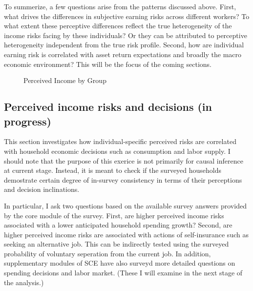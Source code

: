 \documentclass[12pt,notitlepage,onecolumn,aps,pra]{article}
\begin{document}
To summerize, a few questions arise from the patterns discussed above.
First, what drives the differences in subjective earning risks across
different workers? To what extent these perceptive differences reflect
the true heterogeneity of the income risks facing by these individuals?
Or they can be attributed to perceptive heterogeneity independent from
the true risk profile. Second, how are individual earning risk is
correlated with asset return expectations and broadly the macro economic
environment? This will be the focus of the coming sections.


    \begin{figure*}[!ht]
        \begin{center}\end{center}
        \caption{Perceived Income by Group}
        \label{fig:boxplotbygroup}
    \end{figure*}
    


    \hypertarget{perceived-income-risks-and-decisions-in-progress}{%
\subsection{Perceived income risks and decisions (in
progress)}\label{perceived-income-risks-and-decisions-in-progress}}

This section investigates how individual-specific perceived risks are
correlated with household economic decisions such as consumption and
labor supply. I should note that the purpose of this exerice is not
primarily for causal inference at current stage. Instead, it is meant to
check if the surveyed households demostrate certain degree of in-survey
consistency in terms of their perceptions and decision inclinations.

In particular, I ask two questions based on the available survey answers
provided by the core module of the survey. First, are higher perceived
income risks associated with a lower anticipated household spending
growth? Second, are higher perceived income risks are associated with
actions of self-insurance such as seeking an alternative job. This can
be indirectly tested using the surveyed probability of voluntary
seperation from the current job. In addition, supplementary modules of
SCE have also surveyd more detailed questions on spending decisions and
labor market. (These I will examine in the next stage of the analysis.)
\end{document}

